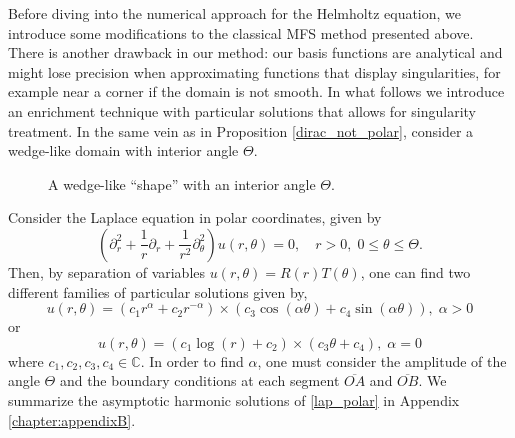 Before diving into the numerical approach for the Helmholtz equation, we introduce some modifications to the classical \ac{MFS} method presented above. There is another drawback in our method: our basis functions are analytical and might lose precision when approximating functions that display singularities, for example near a corner if the domain is not smooth. In what follows we introduce an enrichment technique with particular solutions that allows for singularity treatment. In the same vein as in Proposition \ref{dirac_not_polar}, consider a wedge-like domain with interior angle \(\Theta\).

\begin{figure}[H]
\centering
{}
\caption{A wedge-like ``shape'' with an interior angle \(\Theta\).}\label{wedge}
\end{figure}
Consider the Laplace equation in polar coordinates, given by
\begin{equation}\label{lap_polar}
    \left(\partial_r^2 + \frac{1}{r} \partial_r +\frac{1}{r^2}\partial_\theta^2\right)u(r,\theta) = 0, \quad r>0, \; 0 \leq \theta \leq \Theta.
\end{equation}
Then, by separation of variables \(u(r, \theta) = R(r) T(\theta)\), one can find two different families of particular solutions given by,
\[
    u(r,\theta) = \left(c_1 r^\alpha + c_2 r^{-\alpha}\right) \times \left(c_3 \cos(\alpha \theta) + c_4 \sin(\alpha \theta)\right), \; \alpha >0
\]
or
\[
    u(r,\theta) = \left(c_1 \log (r) + c_2 \right) \times \left(c_3 \theta + c_4 \right), \; \alpha =0
\]
where \(c_1, c_2, c_3, c_4 \in \mathbb{C}\). In order to find \(\alpha\), one must consider the amplitude of the angle \(\Theta\) and the boundary conditions at each segment \(\overline{OA}\) and \(\overline{OB}\). We summarize the asymptotic harmonic solutions of \eqref{lap_polar} in Appendix \ref{chapter:appendixB}. 
